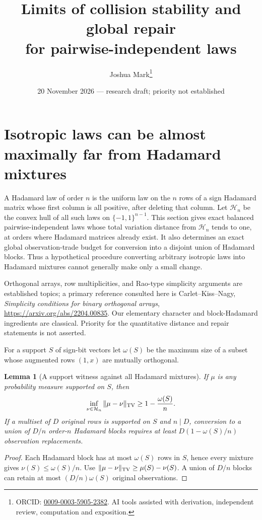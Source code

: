 \documentclass[11pt]{article}
\title{Limits of collision stability and global repair\\for pairwise-independent laws}
\author{Joshua Mark\thanks{ORCID: \href{https://orcid.org/0009-0003-5905-2382}{0009-0003-5905-2382}. AI tools assisted with derivation, independent review, computation and exposition.}}
\date{20 November 2026 --- research draft; priority not established}
\newtheorem{lemma}[theorem]{Lemma}
\begin{document}
\maketitle
\section{Isotropic laws can be almost maximally far from Hadamard mixtures}
\label{sec:design-hadamard-distance}
A Hadamard law of order $n$ is the uniform law on the $n$ rows of a
sign Hadamard matrix whose first column is all positive, after deleting
that column. Let $\mathcal H_n$ be the convex hull of all such laws on
$\{-1,1\}^{n-1}$. This section gives exact balanced pairwise-independent
laws whose total variation distance from $\mathcal H_n$ tends to one,
at orders where Hadamard matrices already exist. It also determines
an exact global observation-trade budget for conversion into a disjoint
union of Hadamard blocks. Thus a hypothetical procedure converting
arbitrary isotropic laws into Hadamard mixtures cannot generally make
only a small change.

Orthogonal arrays, row multiplicities, and Rao-type simplicity arguments
are established topics; a primary reference consulted here is
Carlet--Kiss--Nagy, \emph{Simplicity conditions for binary orthogonal arrays},
\url{https://arxiv.org/abs/2204.00835}. Our elementary character and
block-Hadamard ingredients are classical. Priority for the quantitative
distance and repair statements is not asserted.

For a support $S$ of sign-bit vectors let $\omega(S)$ be the maximum
size of a subset whose augmented rows $(1,x)$ are mutually orthogonal.
\begin{lemma}[A support witness against all Hadamard mixtures]
\label{lem:design-support-witness}
If $\mu$ is any probability measure supported on $S$, then
\[
 \inf_{\nu\in\mathcal H_n}\|\mu-\nu\|_{\rm TV}
 \ge1-\frac{\omega(S)}n.
\]
If a multiset of $D$ original rows is supported on $S$ and $n\mid D$,
conversion to a union of $D/n$ order-$n$ Hadamard blocks requires at
least $D(1-\omega(S)/n)$ observation replacements.
\end{lemma}
\begin{proof}
Each Hadamard block has at most $\omega(S)$ rows in $S$, hence every
mixture gives $\nu(S)\le\omega(S)/n$. Use
$\|\mu-\nu\|_{\rm TV}\ge\mu(S)-\nu(S)$. A union of $D/n$ blocks
can retain at most $(D/n)\omega(S)$ original observations.
\end{proof}
\end{document}
